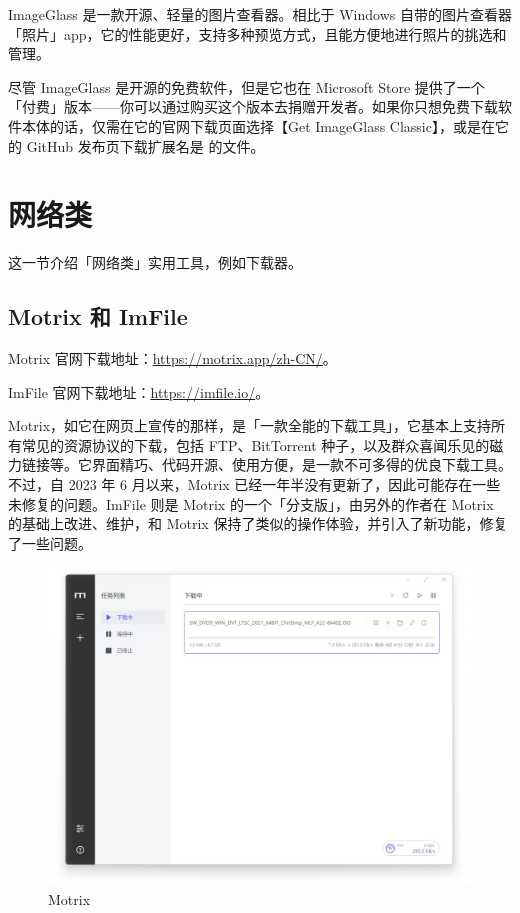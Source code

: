 ImageGlass 是一款开源、轻量的图片查看器。相比于 Windows 自带的图片查看器「照片」app，它的性能更好，支持多种预览方式，且能方便地进行照片的挑选和管理。

尽管 ImageGlass 是开源的免费软件，但是它也在 Microsoft Store 提供了一个「付费」版本——你可以通过购买这个版本去捐赠开发者。如果你只想免费下载软件本体的话，仅需在它的官网下载页面选择【Get ImageGlass Classic】，或是在它的 GitHub 发布页下载扩展名是  的文件。

\section{网络类}

这一节介绍「网络类」实用工具，例如下载器。

\subsection{Motrix 和 ImFile}

Motrix 官网下载地址：\url{https://motrix.app/zh-CN/}。

ImFile 官网下载地址：\url{https://imfile.io/}。

Motrix，如它在网页上宣传的那样，是「一款全能的下载工具」，它基本上支持所有常见的资源协议的下载，包括 FTP、BitTorrent 种子，以及群众喜闻乐见的磁力链接等。它界面精巧、代码开源、使用方便，是一款不可多得的优良下载工具。不过，自 2023 年 6 月以来，Motrix 已经一年半没有更新了，因此可能存在一些未修复的问题。ImFile 则是 Motrix 的一个「分支版」，由另外的作者在 Motrix 的基础上改进、维护，和 Motrix 保持了类似的操作体验，并引入了新功能，修复了一些问题。

\begin{figure}[htb!]
  \centering
  \includegraphics[width=.6\textwidth]{assets/software/Motrix.png}
  \caption{Motrix}
  \label{fig:Motrix}
\end{figure}

